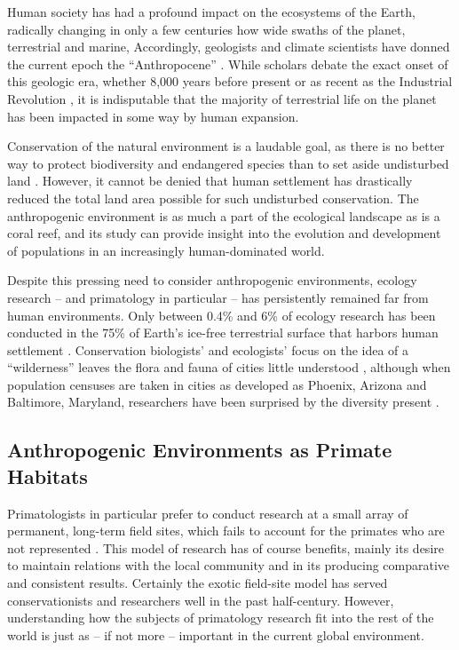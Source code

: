 \documentclass[american]{../../../coursework}
\begin{document}
Human society has had a profound impact on the ecosystems of the Earth,
radically changing in only a few centuries how wide swaths of the planet,
terrestrial and marine, Accordingly, geologists and climate scientists have
donned the current epoch the ``Anthropocene'' \parencite{Cru00,Lew15}. While
scholars debate the exact onset of this geologic era, whether 8,000 years
before present \parencite{Rud03,Kir05} or as recent as the Industrial
Revolution \parencite{Cru02}, it is indisputable that the majority of
terrestrial life on the planet has been impacted in some way by human
expansion. 

Conservation of the natural environment is a laudable goal, as there is no
better way to protect biodiversity and endangered species than to set aside
undisturbed land \parencite{New95,Hat19}. However, it cannot be denied that
human settlement has drastically reduced the total land area possible for such
undisturbed conservation. The anthropogenic environment is as much a part of
the ecological landscape as is a coral reef, and its study can provide insight
into the evolution and development of populations in an increasingly
human-dominated world.

Despite this pressing need to consider anthropogenic environments, ecology
research -- and primatology in particular -- has persistently remained far
from human environments. Only between 0.4\% and 6\% of ecology research has
been conducted in the 75\% of Earth's ice-free terrestrial surface that
harbors human settlement \parencite{Col00,Mil02}. Conservation biologists' and
ecologists' focus on the idea of a ``wilderness'' leaves the flora and fauna
of cities little understood \parencite{Nie99}, although when population
censuses are taken in cities as developed as Phoenix, Arizona and Baltimore,
Maryland, researchers have been surprised by the diversity present
\parencite{Klo99}.

\subsection{Anthropogenic Environments as Primate Habitats}

Primatologists in particular prefer to conduct research at a small array of
permanent, long-term field sites, which fails to account for the primates who
are not represented \parencite{Bez19}. This model of research has of course
benefits, mainly its desire to maintain relations with the local community and
in its producing comparative and consistent results. Certainly the exotic
field-site model has served conservationists and researchers well in the past
half-century. However, understanding how the subjects of primatology research
fit into the rest of the world is just as -- if not more -- important in the
current global environment.
\end{document}
